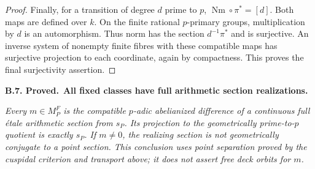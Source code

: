 \documentclass[11pt,a4paper]{article}
\newenvironment{claim}[3]{\par\medskip\noindent\hypertarget{#1}{\textbf{#1. #2.}}\ \textbf{#3.}\par\nopagebreak\smallskip\begingroup\itshape}{\endgroup\par\smallskip}
\begin{document}
\begin{proof}
Finally, for a transition of degree $d$ prime to $p$,
$\operatorname{Nm}\circ\pi^*=[d]$. Both maps are defined over
$k$. On the finite rational $p$-primary groups, multiplication by
$d$ is an automorphism. Thus norm has the section
$d^{-1}\pi^*$ and is surjective. An inverse system of nonempty
finite fibres with these compatible maps has surjective projection
to each coordinate, again by compactness. This proves the final
surjectivity assertion.
\end{proof}

\begin{claim}{B.7}{Proved}{All fixed classes have full arithmetic section realizations}
Every $m\in M_P^F$ is the compatible $p$-adic abelianized
difference of a continuous full étale arithmetic section from
$s_P$. Its projection to the geometrically prime-to-$p$ quotient
is exactly $s_P$. If $m\ne0$, the realizing section is not
geometrically conjugate to a point section. This conclusion uses
point separation proved by the cuspidal criterion and transport
above; it does not assert free deck orbits for $m$.
\end{claim}
\end{document}
